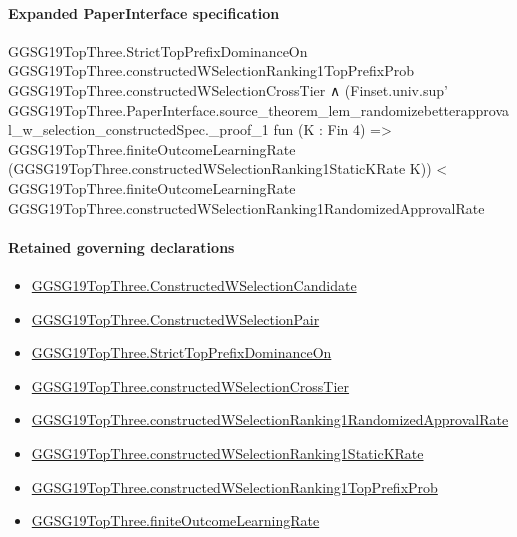 \documentclass[10pt]{article}
\begin{document}
\paragraph{Expanded PaperInterface specification}
\begin{ReviewVerbatim}
GGSG19TopThree.StrictTopPrefixDominanceOn GGSG19TopThree.constructedWSelectionRanking1TopPrefixProb
    GGSG19TopThree.constructedWSelectionCrossTier ∧
  (Finset.univ.sup'
      GGSG19TopThree.PaperInterface.source_theorem_lem_randomizebetterapproval_w_selection_constructedSpec._proof_1
      fun (K : Fin 4) =>
      GGSG19TopThree.finiteOutcomeLearningRate (GGSG19TopThree.constructedWSelectionRanking1StaticKRate K)) <
    GGSG19TopThree.finiteOutcomeLearningRate GGSG19TopThree.constructedWSelectionRanking1RandomizedApprovalRate
\end{ReviewVerbatim}

\paragraph{Retained governing declarations}
\begin{itemize}\raggedright
\item \hyperlink{governing-declaration-3d8d24c3324b5679}{GGSG19\allowbreak{}Top\allowbreak{}Three.\allowbreak{}Constructed\allowbreak{}W\allowbreak{}Selection\allowbreak{}Candidate}
\item \hyperlink{governing-declaration-e199ab04eef2bd8a}{GGSG19\allowbreak{}Top\allowbreak{}Three.\allowbreak{}Constructed\allowbreak{}W\allowbreak{}Selection\allowbreak{}Pair}
\item \hyperlink{governing-declaration-bf5a84db299015a8}{GGSG19\allowbreak{}Top\allowbreak{}Three.\allowbreak{}Strict\allowbreak{}Top\allowbreak{}Prefix\allowbreak{}Dominance\allowbreak{}On}
\item \hyperlink{governing-declaration-53593c505a5f488d}{GGSG19\allowbreak{}Top\allowbreak{}Three.\allowbreak{}constructed\allowbreak{}W\allowbreak{}Selection\allowbreak{}Cross\allowbreak{}Tier}
\item \hyperlink{governing-declaration-fe074537d2757c2a}{GGSG19\allowbreak{}Top\allowbreak{}Three.\allowbreak{}constructed\allowbreak{}W\allowbreak{}Selection\allowbreak{}Ranking1\allowbreak{}Randomized\allowbreak{}Approval\allowbreak{}Rate}
\item \hyperlink{governing-declaration-8f00d3311ee6c44f}{GGSG19\allowbreak{}Top\allowbreak{}Three.\allowbreak{}constructed\allowbreak{}W\allowbreak{}Selection\allowbreak{}Ranking1\allowbreak{}Static\allowbreak{}K\allowbreak{}Rate}
\item \hyperlink{governing-declaration-12d9b4242a250f3f}{GGSG19\allowbreak{}Top\allowbreak{}Three.\allowbreak{}constructed\allowbreak{}W\allowbreak{}Selection\allowbreak{}Ranking1\allowbreak{}Top\allowbreak{}Prefix\allowbreak{}Prob}
\item \hyperlink{governing-declaration-6ccba7634ffd53cd}{GGSG19\allowbreak{}Top\allowbreak{}Three.\allowbreak{}finite\allowbreak{}Outcome\allowbreak{}Learning\allowbreak{}Rate}
\end{itemize}
\end{document}
